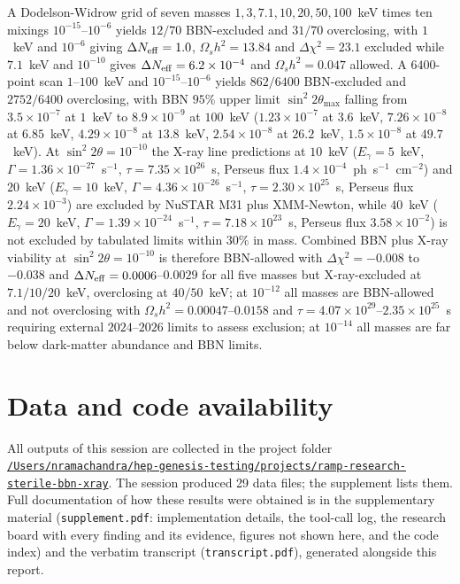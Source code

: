 \documentclass[11pt,a4paper]{article}
\begin{document}
A Dodelson-Widrow grid of seven masses $1,3,7.1,10,20,50,100$~keV times ten mixings $10^{-15}$--$10^{-6}$ yields $12/70$ BBN-excluded and $31/70$ overclosing, with $1$~keV and $10^{-6}$ giving $\Delta N_{\rm eff}=1.0$, $\Omega_{s}h^{2}=13.84$ and $\Delta\chi^{2}=23.1$ excluded while $7.1$~keV and $10^{-10}$ gives $\Delta N_{\rm eff}=6.2\times10^{-4}$ and $\Omega_{s}h^{2}=0.047$ allowed. A $6400$-point scan $1$--$100$~keV and $10^{-15}$--$10^{-6}$ yields $862/6400$ BBN-excluded and $2752/6400$ overclosing, with BBN $95\%$ upper limit $\sin^{2}2\theta_{\max}$ falling from $3.5\times10^{-7}$ at $1$~keV to $8.9\times10^{-9}$ at $100$~keV ($1.23\times10^{-7}$ at $3.6$~keV, $7.26\times10^{-8}$ at $6.85$~keV, $4.29\times10^{-8}$ at $13.8$~keV, $2.54\times10^{-8}$ at $26.2$~keV, $1.5\times10^{-8}$ at $49.7$~keV). At $\sin^{2}2\theta=10^{-10}$ the X-ray line predictions at $10$~keV ($E_{\gamma}=5$~keV, $\Gamma=1.36\times10^{-27}$~s$^{-1}$, $\tau=7.35\times10^{26}$~s, Perseus flux $1.4\times10^{-4}$~ph~s$^{-1}$~cm$^{-2}$) and $20$~keV ($E_{\gamma}=10$~keV, $\Gamma=4.36\times10^{-26}$~s$^{-1}$, $\tau=2.30\times10^{25}$~s, Perseus flux $2.24\times10^{-3}$) are excluded by NuSTAR M31 plus XMM-Newton, while $40$~keV ($E_{\gamma}=20$~keV, $\Gamma=1.39\times10^{-24}$~s$^{-1}$, $\tau=7.18\times10^{23}$~s, Perseus flux $3.58\times10^{-2}$) is not excluded by tabulated limits within $30\%$ in mass. Combined BBN plus X-ray viability at $\sin^{2}2\theta=10^{-10}$ is therefore BBN-allowed with $\Delta\chi^{2}=-0.008$ to $-0.038$ and $\Delta N_{\rm eff}=0.0006$--$0.0029$ for all five masses but X-ray-excluded at $7.1/10/20$~keV, overclosing at $40/50$~keV; at $10^{-12}$ all masses are BBN-allowed and not overclosing with $\Omega_{s}h^{2}=0.00047$--$0.0158$ and $\tau=4.07\times10^{29}$--$2.35\times10^{25}$~s requiring external $2024$--$2026$ limits to assess exclusion; at $10^{-14}$ all masses are far below dark-matter abundance and BBN limits.

\section*{Data and code availability}
All outputs of this session are collected in the project folder \href{file:///Users/nramachandra/hep-genesis-testing/projects/ramp-research-sterile-bbn-xray}{\texttt{/\allowbreak{}Users/\allowbreak{}nramachandra/\allowbreak{}hep-genesis-testing/\allowbreak{}projects/\allowbreak{}ramp-research-sterile-bbn-xray}}.
The session produced 29 data files; the supplement lists them.
Full documentation of how these results were obtained is in the supplementary material (\texttt{supplement.pdf}: implementation details, the tool-call log, the research board with every finding and its evidence, figures not shown here, and the code index) and the verbatim transcript (\texttt{transcript.pdf}), generated alongside this report.
\end{document}

